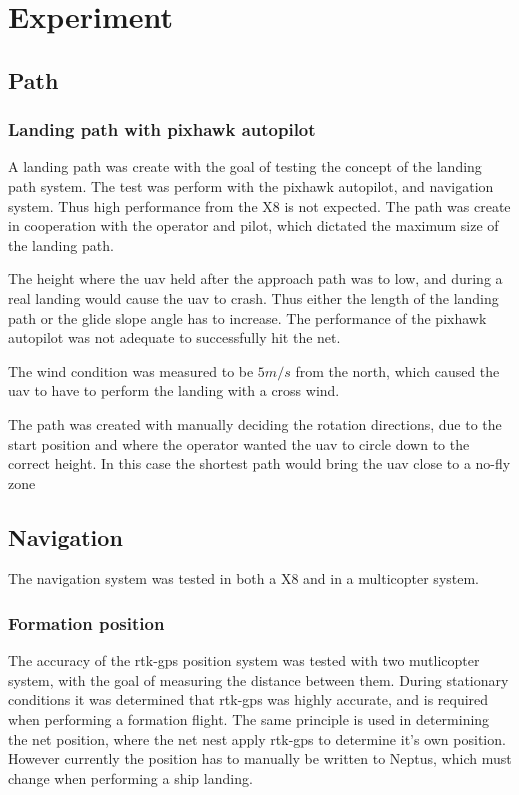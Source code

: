 \chapter{Experiment}
\section{Path}
\subsection{Landing path with pixhawk autopilot}
A landing path was create with the goal of testing the concept of the landing path system. The test was perform with the pixhawk autopilot, and navigation system. Thus high performance from the X8 is not expected. The path was create in cooperation with the operator and pilot, which dictated the maximum size of the landing path.

The height where the \gls{uav} held after the approach path was to low, and during a real landing would cause the \gls{uav} to crash. Thus either the length of the landing path or the glide slope angle has to increase. The performance of the pixhawk autopilot was not adequate to successfully hit the net.

The wind condition was measured to be $5m/s$ from the north, which caused the \gls{uav} to have to perform the landing with a cross wind.

The path was created with manually deciding the rotation directions, due to the start position and where the operator wanted the \gls{uav} to circle down to the correct height. In this case the shortest path would bring the \gls{uav} close to a no-fly zone
\section{Navigation}
The navigation system was tested in both a X8 and in a multicopter system.

\subsection{Formation position}
The accuracy of the \gls{rtk-gps} position system was tested with two mutlicopter system, with the goal of measuring the distance between them. During stationary conditions it was determined that \gls{rtk-gps} was highly accurate, and is required when performing a formation flight. The same principle is used in determining the net position, where the net nest apply \gls{rtk-gps} to determine it's own position. However currently the position has to manually be written to Neptus, which must change when performing a ship landing.
